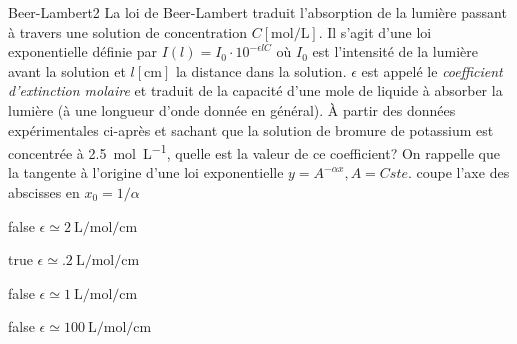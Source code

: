 		\begin{question}{27}{Beer-Lambert}{2}{}
            La loi de Beer-Lambert traduit l'absorption de la lumière passant à travers une solution de concentration $C[\si{\mole\per\liter}]$. Il s'agit d'une loi exponentielle définie par $I(l) = I_0\cdot 10^{-\epsilon l C}$ où $I_0$ est l'intensité de la lumière avant la solution et  $l[\si{\centi\meter}]$ la distance dans la solution. $\epsilon$ est appelé le \emph{coefficient d'extinction molaire} et traduit de la capacité d'une mole de liquide à absorber la lumière (à une longueur d'onde donnée en général). À partir des données expérimentales ci-après et sachant que la solution de bromure de potassium est concentrée à \SI{2.5}{\mole\per\liter}, quelle est la valeur de ce coefficient? On rappelle que la tangente à l'origine d'une loi exponentielle $y = A^{-\alpha x}, A = Cste.$ coupe l'axe des abscisses en $x_0 = 1/\alpha$
            \begin{figure}
             \end{figure}
        \end{question}
        \begin{reponses}
            \item[false] $\epsilon \simeq \SI{2}{\liter\per\mole\per\centi\meter}$
		    \item[true] $\epsilon \simeq \SI{.2}{\liter\per\mole\per\centi\meter}$
		    \item[false] $\epsilon \simeq \SI{1}{\liter\per\mole\per\centi\meter}$
		    \item[false] $\epsilon \simeq \SI{100}{\liter\per\mole\per\centi\meter}$
		    \end{reponses}
